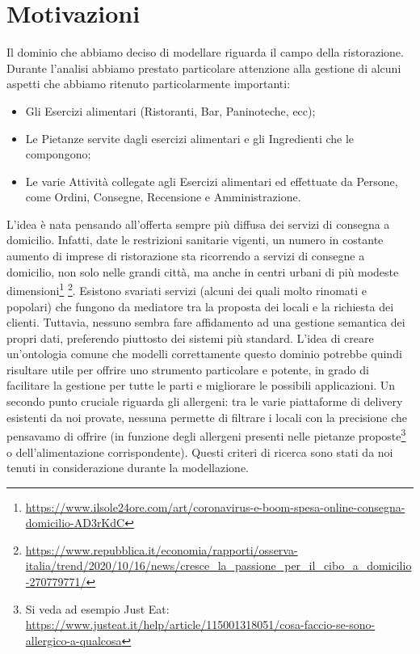 \documentclass[12pt]{article}
\begin{document}
\section{Motivazioni}
Il dominio che abbiamo deciso di modellare riguarda il campo della ristorazione. 
Durante l'analisi abbiamo prestato particolare attenzione alla gestione di alcuni aspetti che abbiamo ritenuto particolarmente importanti:
\begin{itemize}
    \item Gli Esercizi alimentari (Ristoranti, Bar, Paninoteche, ecc);
    \item Le Pietanze servite dagli esercizi alimentari e gli Ingredienti che le compongono;
    \item Le varie Attività collegate agli Esercizi alimentari ed effettuate da Persone, come Ordini, Consegne, Recensione e Amministrazione.
\end{itemize}
L'idea è nata pensando all'offerta sempre più diffusa dei servizi di consegna a domicilio.
Infatti, date le restrizioni sanitarie vigenti, un numero in costante aumento di imprese di ristorazione sta ricorrendo a servizi di consegne a domicilio, non solo nelle grandi città, ma anche in centri urbani di più modeste dimensioni\footnote{\url{https://www.ilsole24ore.com/art/coronavirus-e-boom-spesa-online-consegna-domicilio-AD3rKdC}} \footnote{\url{https://www.repubblica.it/economia/rapporti/osserva-italia/trend/2020/10/16/news/cresce_la_passione_per_il_cibo_a_domicilio-270779771/}}.\newline
Esistono svariati servizi (alcuni dei quali molto rinomati e popolari) che fungono da mediatore tra la proposta dei locali e la richiesta dei clienti. 
Tuttavia, nessuno sembra fare affidamento ad una gestione semantica dei propri dati, preferendo piuttosto dei sistemi più standard.\newline
L'idea di creare un'ontologia comune che modelli correttamente questo dominio potrebbe quindi risultare utile per offrire uno strumento particolare e potente, in grado di facilitare la gestione per tutte le parti e migliorare le possibili applicazioni.\newline
Un secondo punto cruciale riguarda gli allergeni: tra le varie piattaforme di delivery esistenti da noi provate, nessuna permette di filtrare i locali con la precisione che pensavamo di offrire (in funzione degli allergeni presenti nelle pietanze proposte\footnote{Si veda ad esempio Just Eat: \url{https://www.justeat.it/help/article/115001318051/cosa-faccio-se-sono-allergico-a-qualcosa}} o dell'alimentazione corrispondente).
Questi criteri di ricerca sono stati da noi tenuti in considerazione durante la modellazione.
\end{document}
